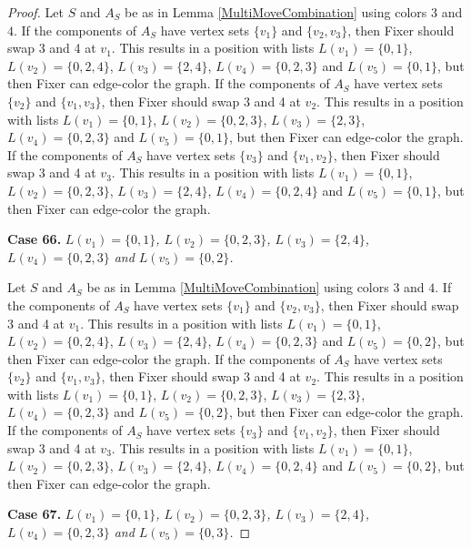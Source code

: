 \documentclass[12pt]{amsart}
\theoremstyle{plain}
\theoremstyle{definition}
\theoremstyle{remark}
\begin{document}
\begin{proof}
Let $S$ and $A_S$ be as in Lemma \ref{MultiMoveCombination} using colors $3$ and $4$. If the components of $A_S$ have vertex sets $\{v_1\}$ and $\{v_2, v_3\}$, then Fixer should swap 3 and 4 at $v_1$. This results in a position with lists $L(v_1) = \{0, 1\}$, $L(v_2) = \{0, 2, 4\}$, $L(v_3) = \{2, 4\}$, $L(v_4) = \{0, 2, 3\}$ and $L(v_5) = \{0, 1\}$, but then Fixer can edge-color the graph.
If the components of $A_S$ have vertex sets $\{v_2\}$ and $\{v_1, v_3\}$, then Fixer should swap 3 and 4 at $v_2$. This results in a position with lists $L(v_1) = \{0, 1\}$, $L(v_2) = \{0, 2, 3\}$, $L(v_3) = \{2, 3\}$, $L(v_4) = \{0, 2, 3\}$ and $L(v_5) = \{0, 1\}$, but then Fixer can edge-color the graph.
If the components of $A_S$ have vertex sets $\{v_3\}$ and $\{v_1, v_2\}$, then Fixer should swap 3 and 4 at $v_3$. This results in a position with lists $L(v_1) = \{0, 1\}$, $L(v_2) = \{0, 2, 3\}$, $L(v_3) = \{2, 4\}$, $L(v_4) = \{0, 2, 4\}$ and $L(v_5) = \{0, 1\}$, but then Fixer can edge-color the graph.

\noindent\textbf{Case 66.  }\textit{$L(v_1) = \{0, 1\}$, $L(v_2) = \{0, 2, 3\}$, $L(v_3) = \{2, 4\}$, $L(v_4) = \{0, 2, 3\}$ and $L(v_5) = \{0, 2\}$.}

Let $S$ and $A_S$ be as in Lemma \ref{MultiMoveCombination} using colors $3$ and $4$. If the components of $A_S$ have vertex sets $\{v_1\}$ and $\{v_2, v_3\}$, then Fixer should swap 3 and 4 at $v_1$. This results in a position with lists $L(v_1) = \{0, 1\}$, $L(v_2) = \{0, 2, 4\}$, $L(v_3) = \{2, 4\}$, $L(v_4) = \{0, 2, 3\}$ and $L(v_5) = \{0, 2\}$, but then Fixer can edge-color the graph.
If the components of $A_S$ have vertex sets $\{v_2\}$ and $\{v_1, v_3\}$, then Fixer should swap 3 and 4 at $v_2$. This results in a position with lists $L(v_1) = \{0, 1\}$, $L(v_2) = \{0, 2, 3\}$, $L(v_3) = \{2, 3\}$, $L(v_4) = \{0, 2, 3\}$ and $L(v_5) = \{0, 2\}$, but then Fixer can edge-color the graph.
If the components of $A_S$ have vertex sets $\{v_3\}$ and $\{v_1, v_2\}$, then Fixer should swap 3 and 4 at $v_3$. This results in a position with lists $L(v_1) = \{0, 1\}$, $L(v_2) = \{0, 2, 3\}$, $L(v_3) = \{2, 4\}$, $L(v_4) = \{0, 2, 4\}$ and $L(v_5) = \{0, 2\}$, but then Fixer can edge-color the graph.

\noindent\textbf{Case 67.  }\textit{$L(v_1) = \{0, 1\}$, $L(v_2) = \{0, 2, 3\}$, $L(v_3) = \{2, 4\}$, $L(v_4) = \{0, 2, 3\}$ and $L(v_5) = \{0, 3\}$.}


\end{proof}
\end{document}

